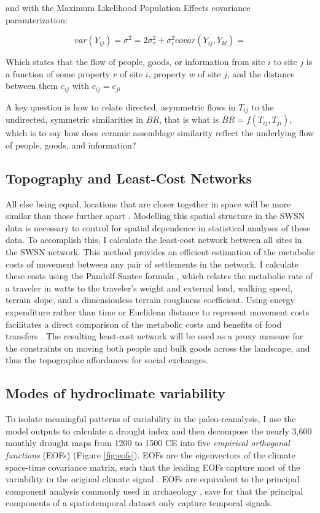 \documentclass[fleqn,10pt]{wlscirep}
\begin{document}
and with the Maximum Likelihood Population Effects covariance paramterization:

\begin{equation}
    var(Y_{ij}) = \sigma^2 = 2\sigma^{2}_{\tau} + \sigma^{2}_{\epsilon}
    covar(Y_{ij}, Y_{kl}) =  
\end{equation}

Which states that the flow of people, goods, or information from site $i$ to site $j$ is a function of some property $v$ of site $i$, property $w$ of site $j$, and the distance between them $c_{ij}$ with $c_{ij} = c_{ji}$

A key question is how to relate directed, asymmetric flows in $T_{ij}$ to the undirected, symmetric similarities in $BR$, that is what is $BR = f(T_{ij},T_{ji})$, which is to say how does ceramic assemblage similarity reflect the underlying flow of people, goods, and information?

\subsection*{Topography and Least-Cost Networks}
All else being equal, locations that are closer together in space will be more similar than those further apart \cite{Tobler1970}. Modelling this spatial structure in the SWSN data is necessary to control for spatial dependence in statistical analyses of these data. To accomplish this, I calculate the least-cost network between all sites in the SWSN network. This method provides an efficient estimation of the metabolic costs of movement between any pair of settlements in the network. I calculate these costs using the Pandolf-Santee formula \cite{White2012}, which relates the metabolic rate of a traveler in watts to the traveler's weight and external load, walking speed, terrain slope, and a dimensionless terrain roughness coefficient. Using energy expenditure rather than time or Euclidean distance to represent movement costs facilitates a direct comparison of the metabolic costs and benefits of food transfers  \cite{Drennan1984}. The resulting least-cost network will be used as a proxy measure for the constraints on moving both people and bulk goods across the landscape, and thus the topographic affordances for social exchanges.

\subsection*{Modes of hydroclimate variability}
To isolate meaningful patterns of variability in the paleo-reanalysis, I use the model outputs to calculate a drought index and then decompose the nearly 3,600 monthly drought maps from 1200 to 1500 CE into five \textit{empirical orthogonal functions} (EOFs) (Figure \ref{fig:eofs}). EOFs are the eigenvectors of the climate space-time covariance matrix, such that the leading EOFs capture most of the variability in the original climate signal \cite{Lorenz1956EmpiricalPrediction}. EOFs are equivalent to the principal component analysis commonly used in archaeology \cite[e.g.]{Dean1996DemographyStress}, save for that the principal components of a spatiotemporal dataset only capture temporal signals.
\end{document}
